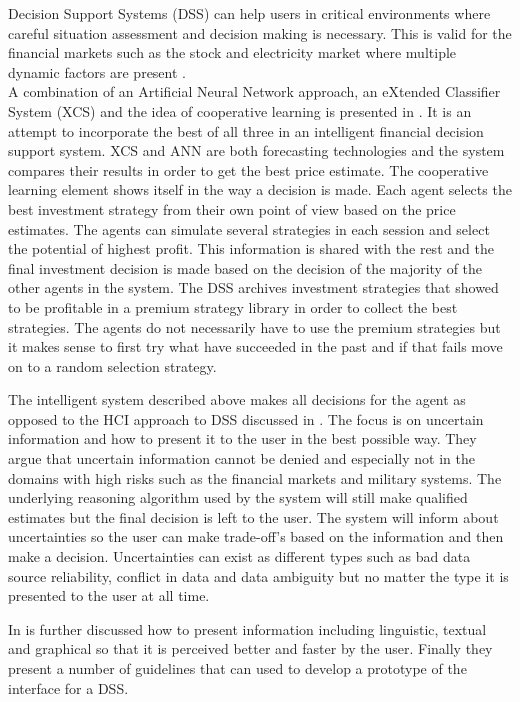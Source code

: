 Decision Support Systems (DSS) can help users in critical environments where careful situation assessment and decision making is necessary. This is valid for the financial markets such as the stock and electricity market where multiple dynamic factors are present \cite{UncertainInformation}.
\\[0.5cm]
A combination of an Artificial Neural Network approach, an eXtended Classifier System (XCS) and the idea of cooperative learning is presented in \cite{groupLearningDS}. It is an attempt to incorporate the best of all three in an intelligent financial decision support system. XCS and ANN are both forecasting technologies and the system compares their results in order to get the best price estimate. The cooperative learning element shows itself in the way a decision is made. Each agent selects the best investment strategy from their own point of view based on the price estimates. The agents can simulate several strategies in each session and select the potential of highest profit. This information is shared with the rest and the final investment decision is made based on the decision of the majority of the other agents in the system. The DSS archives investment strategies that showed to be profitable in a premium strategy library in order to collect the best strategies. The agents do not necessarily have to use the premium strategies but it makes sense to first try what have succeeded in the past and if that fails move on to a random selection strategy. 

The intelligent system described above makes all decisions for the agent as opposed to the HCI approach to DSS discussed in \cite{UncertainInformation}. The focus is on uncertain information and how to present it to the user in the best possible way. They argue that uncertain information cannot be denied and especially not in the domains with high risks such as the financial markets and military systems. The underlying reasoning algorithm used by the system will still make qualified estimates but the final decision is left to the user. The system will inform about uncertainties so the user can make trade-off's based on the information and then make a decision. Uncertainties can exist as different types such as bad data source reliability, conflict in data and data ambiguity but no matter the type it is presented to the user at all time. 

In \cite{UncertainInformation} is further discussed how to present information including linguistic, textual and graphical so that it is perceived better and faster by the user. Finally they present a number of guidelines that can used to develop a prototype of the interface for a DSS.